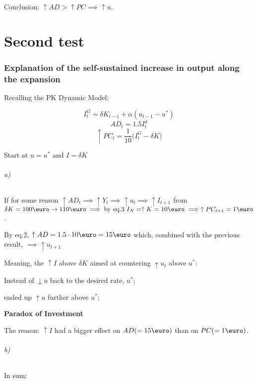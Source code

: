 \documentclass{report}
\begin{document}
Conclusion: $\uparrow AD>\uparrow PC \implies \uparrow u$.


\part{Second test}

\section{Explanation of the self-sustained increase in output along the expansion}

Recalling the PK Dynamic Model: 

\[I^G_t=\delta K_{t-1}+\alpha(u_{t-1}-u^*) \]
\[AD_t=1.5I^d_t\]
\[\uparrow PC_t=\frac{1}{10}\big(I^G_t-\delta K \big) \]

Start at $u=u^*$ and $I=\delta K$

\paragraph{a)} If for some reason $\uparrow AD_t \implies \uparrow Y_t \implies \uparrow u_t \implies \uparrow I_{t+1}$ from $\delta K=100\text{\euro} \rightarrow 110 \text{\euro} \implies \text{by eq.3 } I_N=\uparrow K=10\text{\euro} \implies \uparrow PC_{t+1}=1\text{\euro}$.

By eq.2, $\uparrow AD=1.5\cdot 10\text{\euro}=15\text{\euro}$ which, combined with the previous result, $\implies \uparrow u_{t+1}$

Meaning, the $\uparrow I$ above $\delta K$ aimed at countering $\uparrow u_{t}$ above $u^*$: 
\begin{description}
    \item Instead of $\downarrow u$ back to the desired rate, $u^*$; 
    \item ended up $\uparrow u$ further above $u^*$;
    \item \textbf{Paradox of Investment}
\end{description}

The reason: $\uparrow I$ had a bigger effect on $AD(=15\text{\euro})$ than on $PC(=1\text{\euro})$. 

\paragraph{b)}


In sum:
\end{document}
